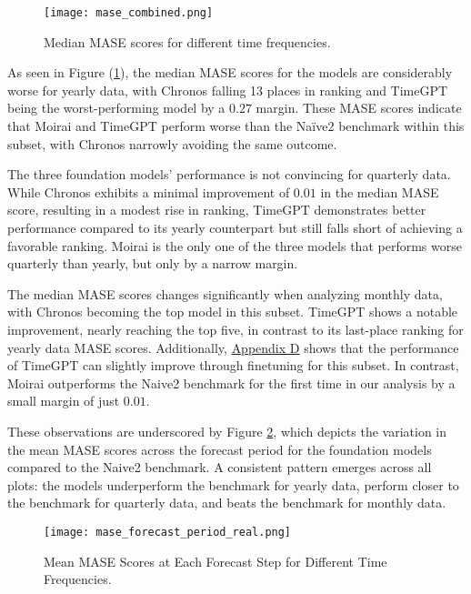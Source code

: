 \documentclass[12pt,a4paper]{article}
\begin{document}
\begin{figure}[htbp]
  \centering
  \texttt{[image: mase\_combined.png]}
  \caption{Median MASE scores for different time frequencies.}
  \label{mase_combined_figure}
\end{figure}

As seen in Figure (\ref{mase_combined_figure}), the median MASE scores for the models are considerably worse for yearly data, with Chronos falling 13 places in ranking and TimeGPT being the worst-performing model by a $0.27$ margin. These MASE scores indicate that Moirai and TimeGPT perform worse than the Naïve2 benchmark within this subset, with Chronos narrowly avoiding the same outcome.

The three foundation models' performance is not convincing for quarterly data. While Chronos exhibits a minimal improvement of $0.01$ in the median MASE score, resulting in a modest rise in ranking, TimeGPT demonstrates better performance compared to its yearly counterpart but still falls short of achieving a favorable ranking. Moirai is the only one of the three models that performs worse quarterly than yearly, but only by a narrow margin. 


The median MASE scores changes significantly when analyzing monthly data, with Chronos becoming the top model in this subset. TimeGPT shows a notable improvement, nearly reaching the top five, in contrast to its last-place ranking for yearly data MASE scores. Additionally, \hyperref[appendix_d]{Appendix D} shows that the performance of TimeGPT can slightly improve through finetuning for this subset. In contrast, Moirai outperforms the Naive2 benchmark for the first time in our analysis by a small margin of just $0.01$. 

These observations are underscored by Figure \ref{mase_rmse_timefrequencies}, which depicts the variation in the mean MASE scores across the forecast period for the foundation models compared to the Naive2 benchmark. A consistent pattern emerges across all plots: the models underperform the benchmark for yearly data, perform closer to the benchmark for quarterly data, and beats the benchmark for monthly data.

\begin{figure}[htbp]
  \centering
  \texttt{[image: mase\_forecast\_period\_real.png]}
  \caption{Mean MASE Scores at Each Forecast Step for Different Time Frequencies.}
  \label{mase_rmse_timefrequencies}
\end{figure}
\end{document}

